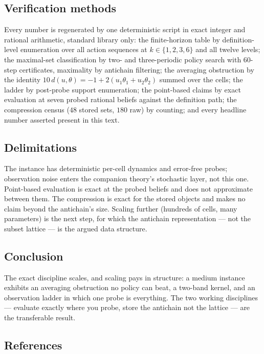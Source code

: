 \documentclass[10pt,twocolumn]{article}
\theoremstyle{plain}
\theoremstyle{definition}
\theoremstyle{remark}
\begin{document}
\subsection{Verification methods}\label{methods}

Every number is regenerated by one deterministic script in exact
integer and rational arithmetic, standard library only: the
finite-horizon table by definition-level enumeration over all action
sequences at \(k \in \{1, 2, 3, 6\}\) and all twelve levels; the
maximal-set classification by two- and three-periodic policy search
with \(60\)-step certificates, maximality by antichain filtering; the
averaging obstruction by the identity \(10\,d(u, \theta) = -1 +
2(u_{1}\theta_{1} + u_{2}\theta_{2})\) summed over the cells; the
ladder by post-probe support enumeration; the point-based claims by
exact evaluation at seven probed rational beliefs against the
definition path; the compression census (\(48\) stored sets, \(180\)
raw) by counting; and every headline number asserted present in this
text.

\subsection{Delimitations}\label{scope}

The instance has deterministic per-cell dynamics and error-free
probes; observation noise enters the companion theory's stochastic
layer, not this one. Point-based evaluation is exact at the probed
beliefs and does not approximate between them. The compression is
exact for the stored objects and makes no claim beyond the antichain's
size. Scaling further (hundreds of cells, many parameters) is the next
step, for which the antichain representation --- not the subset
lattice --- is the argued data structure.

\subsection{Conclusion}\label{conclusion}

The exact discipline scales, and scaling pays in structure: a medium
instance exhibits an averaging obstruction no policy can beat, a
two-band kernel, and an observation ladder in which one probe is
everything. The two working disciplines --- evaluate exactly where you
probe, store the antichain not the lattice --- are the transferable
result.

\subsection*{References}
\end{document}
